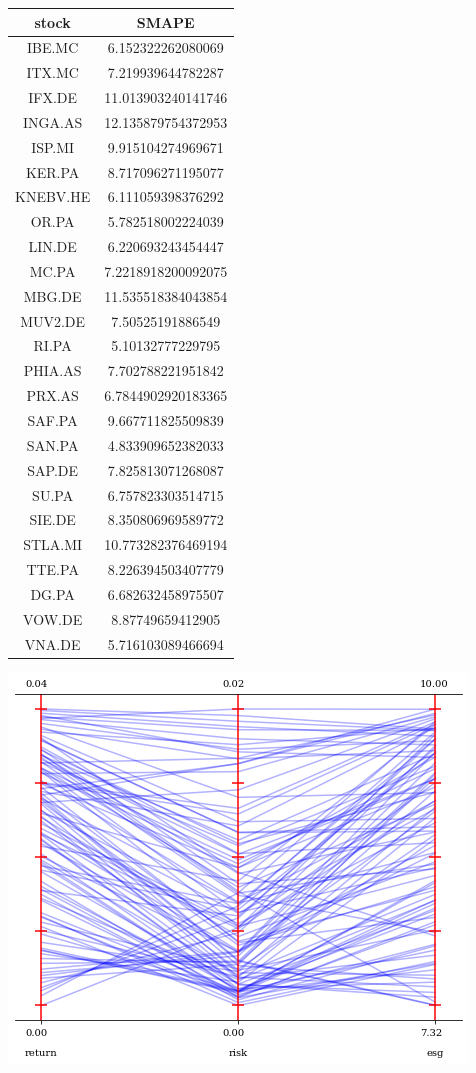 \documentclass[11pt]{article} %
\begin{document}
\begin{tabular}{ | c | c |}
\hline
stock    & SMAPE\\
\hline
IBE.MC   & 6.152322262080069\\
ITX.MC   & 7.219939644782287\\
IFX.DE   & 11.013903240141746\\
INGA.AS  & 12.135879754372953\\
ISP.MI   & 9.915104274969671\\
KER.PA   & 8.717096271195077\\
KNEBV.HE & 6.111059398376292\\
OR.PA    & 5.782518002224039\\
LIN.DE   & 6.220693243454447\\
MC.PA    & 7.2218918200092075\\
MBG.DE   & 11.535518384043854\\
MUV2.DE  & 7.50525191886549\\
RI.PA    & 5.10132777229795\\
PHIA.AS  & 7.702788221951842\\
PRX.AS   & 6.7844902920183365\\
SAF.PA   & 9.667711825509839\\
SAN.PA   & 4.833909652382033\\
SAP.DE   & 7.825813071268087\\
SU.PA    & 6.757823303514715\\
SIE.DE   & 8.350806969589772\\
STLA.MI  & 10.773282376469194\\
TTE.PA   & 8.226394503407779\\
DG.PA    & 6.682632458975507\\
VOW.DE   & 8.87749659412905\\
VNA.DE   & 5.716103089466694\\
\end{tabular}

\includegraphics{pcpPlot}
\end{document}
